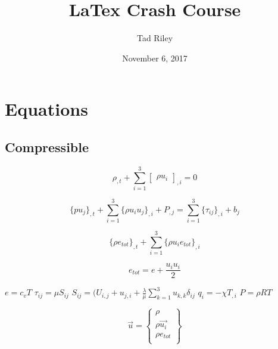 \documentclass{article}
\title{LaTex Crash Course}
\author{Tad Riley}
\date{November 6, 2017}
\begin{document}
\section{Equations}%
\subsection{Compressible}%
\begin{equation}
	\rho_{,t} + \sum_{i=1}^3 \begin{bmatrix} \rho u_i \end{bmatrix}_{,i} =0
\end{equation}

\begin{equation}
\{pu_j\}_{,t} +\sum_{i=1}^3 \{\rho u_iu_j\}_{,i} +P_{,j}=\sum_{i=1}^3\{\tau _{ij}\}_{,i} +b_j
\end{equation}

\begin{equation}
\{\rho e_{tot}\}_{,t} +\sum_{i=1}^3\{\rho u_ie_{tot}\}_{,i}
\end{equation}

\begin{equation}
e_{tot}=e+\frac{u_iu_i}{2}
\end{equation}

$e=c_vT$ 
\newline$\tau _{ij} = \mu S_{ij}$
\newline$S_{ij}=(U_{i,j}+u_{j,i} + \frac{\lambda}{\mu} \sum_{k=1}^3u_{k,k}\delta _{ij}$
\newline$q_i=-\chi T_{,i}$
\newline$P=\rho RT$

\begin{equation}
\vec{u}=
\begin{Bmatrix}
\rho \\
\rho \vec{u_i}\\
\rho e_{tot}\\
\end{Bmatrix}
\end{equation}
\end{document}
